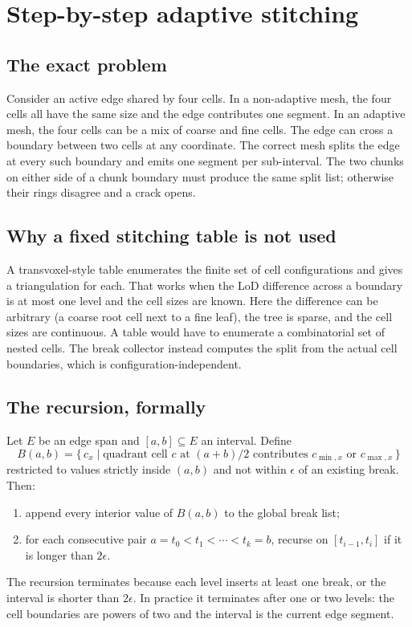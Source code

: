 \section{Step-by-step adaptive stitching}
\label{sec:stitch}

\subsection{The exact problem}

Consider an active edge shared by four cells.  In a non-adaptive mesh, the
four cells all have the same size and the edge contributes one segment.  In
an adaptive mesh, the four cells can be a mix of coarse and fine cells.
The edge can cross a boundary between two cells at any coordinate.  The
correct mesh splits the edge at every such boundary and emits one segment
per sub-interval.  The two chunks on either side of a chunk boundary must
produce the same split list; otherwise their rings disagree and a crack
opens.

\subsection{Why a fixed stitching table is not used}

A transvoxel-style table enumerates the finite set of cell configurations
and gives a triangulation for each.  That works when the LoD difference
across a boundary is at most one level and the cell sizes are known.  Here
the difference can be arbitrary (a coarse root cell next to a fine leaf),
the tree is sparse, and the cell sizes are continuous.  A table would have
to enumerate a combinatorial set of nested cells.  The break collector
instead computes the split from the actual cell boundaries, which is
configuration-independent.

\subsection{The recursion, formally}

Let $E$ be an edge span and $[a,b]\subseteq E$ an interval.  Define
\begin{equation}
  B(a,b) = \{\, c_x \mid \text{quadrant cell } c \text{ at } (a+b)/2
  \text{ contributes } c_{\min,x} \text{ or } c_{\max,x} \,\}
\end{equation}
restricted to values strictly inside $(a,b)$ and not within $\epsilon$ of
an existing break.  Then:
\begin{enumerate}
\item append every interior value of $B(a,b)$ to the global break list;
\item for each consecutive pair $a=t_0<t_1<\cdots<t_k=b$, recurse on
  $[t_{i-1},t_i]$ if it is longer than $2\epsilon$.
\end{enumerate}
The recursion terminates because each level inserts at least one break, or
the interval is shorter than $2\epsilon$.  In practice it terminates after
one or two levels: the cell boundaries are powers of two and the interval
is the current edge segment.

